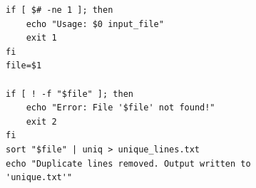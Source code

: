 \begin{verbatim}
if [ $# -ne 1 ]; then
    echo "Usage: $0 input_file"
    exit 1
fi
file=$1

if [ ! -f "$file" ]; then
    echo "Error: File '$file' not found!"
    exit 2
fi
sort "$file" | uniq > unique_lines.txt
echo "Duplicate lines removed. Output written to 
'unique.txt'"
\end{verbatim}